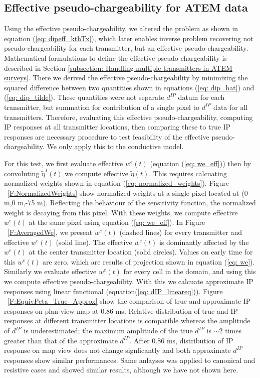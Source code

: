 \documentclass[extra,mreferee]{gji}
\newcommand{\peta}{\tilde{\eta}}
\newcommand{\dip}{d^{IP}}
\begin{document}
\subsection{Effective pseudo-chargeability for ATEM data}
\label{subsection: Effective pseudo-chargeability for ATEM data}
Using the effective pseudo-chargeability, we altered the problem as shown in equation (\ref{eq: dipeff_kthTx}), which later enables inverse problem recovering not pseudo-chargeability for each transmitter, but an effective pseudo-chargeability. Mathematical formulations to define the effective pseudo-chargeability is described in Section \ref{subsection: Handling multiple transmitters in ATEM surveys}. There we derived the effective pseudo-chargeability by minimizing the squared difference between two quantities shown in equations (\ref{eq: dip_hat}) and (\ref{eq: dip_tilde}). These quantities were not separate $\dip$ datum for each transmitter, but summation for contribution of a single pixel to $\dip$ data for all transmitters. 
Therefore, evaluating this effective pseudo-chargeability, computing IP responses at all transmitter locations, then comparing these to true IP responses are necessary procedure to test feasibility of the effective pseudo-chargeability. 
We only apply this to the conductive model. 

For this test, we first evaluate effective $w^e(t)$ (equation (\ref{eq: we_eff})) then by convoluting $\peta^I(t)$ we compute effective $\peta(t)$. 
This requires calcuating normalized weights shown in equation (\ref{eq: normalized_weights}). 
Figure ~\ref{F:NormalizedWeights} show normalized weights at a single pixel located at (0 m,0 m,-75 m). Reflecting the behaviour of the sensitivity function, the normalized weight is decaying from this pixel. 
With these weights, we compute effective $w^e(t)$ at the same pixel using equation (\ref{eq: we_eff}). 
In Figure ~\ref{F:AveragedWe}, we present $w^e(t)$ (dashed lines) for every transmitter and effective $w^e(t)$ (solid line).
The effective $w^e(t)$ is dominantly affected by the $w^e(t)$ at the center transmitter location (solid circles). Values on early time for this $w^e(t)$ are zero, which are results of projection shown in equation (\ref{eq: we}).
Similarly we evaluate effective $w^e(t)$ for every cell in the domain, and using this we compute effective pseudo-chargeability.
With this we calcuate approximate IP responses using linear functional (equation(\ref{eq: dIP_lineareq})).
Figure ~\ref{F:EquivPeta_True_Approx} show the comparison of true and approximate IP responses on plan view map at 0.86 ms. Relative distribution of true and IP responses at different transmitter locations is compatible whereas the amplitude of $\dip$ is underestimated; the maximum amplitude of the true $\dip$ is $\sim$2 times greater than that of the approximate $\dip$. 
After 0.86 ms, distribution of IP response on map view does not change signficantly and both approximate $\dip$ responses show similar performances.
Same anlayses was applied to canonical and resistive cases and showed similar results, although we have not shown here. 
\end{document}
